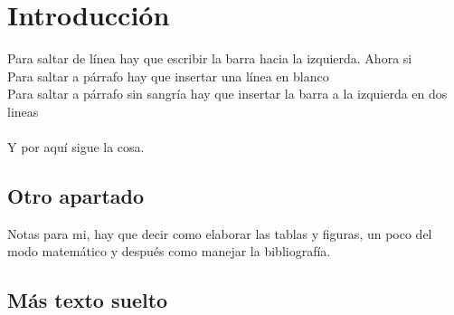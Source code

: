 \documentclass[a4paper, 11pt]{article}
\newcommand{\excluirpagina}[1]{\addtocounter{page}{-1}} %
\begin{document}

\newpage
\thispagestyle{fancy} 
\excluirpagina

\tableofcontents
\listoffigures
\listoftables


\newpage
\pagestyle{cuerpo}
\thispagestyle{cuerpo}

\section{Introducción}

Para saltar de línea hay  que escribir la barra hacia la izquierda. Ahora si \\
Para saltar a párrafo hay que insertar una línea en blanco\\

Para saltar a párrafo sin sangría hay que insertar la barra a la izquierda en dos lineas\\
\\
Y por aquí sigue la cosa.

\subsection{Otro apartado}

Notas para mi, hay que decir como elaborar las tablas y figuras, un poco del modo matemático y después como manejar la bibliografía.

\subsection{Más texto suelto}
	\lipsum 


\end{document}
